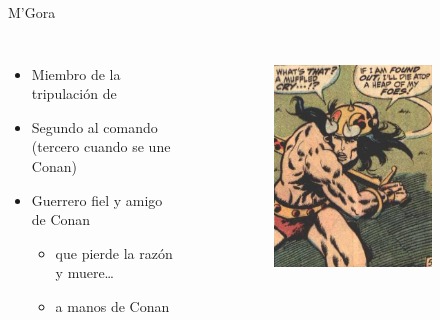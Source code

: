 \begin{frame}{M’Gora}
	\begin{columns}
		\begin{itemize}
			\item Miembro de la tripulación de 
			\item Segundo al comando (tercero cuando se une Conan)
			\item Guerrero fiel y amigo de Conan
			\begin{itemize}
				\item que pierde la razón y muere\ldots
				\item a manos de Conan
			\end{itemize}
		\end{itemize}
		\begin{figure}[htp]
			\centering
			\begin{subfigure}[b]{0.3\textwidth}
				\includegraphics[width=\textwidth]{img/conan/CTB}
			\end{subfigure}

\end{figure}
\end{columns}
\end{frame}
